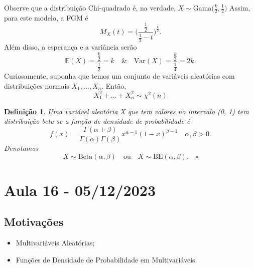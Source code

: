 \documentclass{article}
\newtheorem*{def*}{\underline{Defini\c c\~ao}}
\begin{document}
Observe que a distribuição Chi-quadrado é, na verdade, \(X\sim \mathrm{Gama}\biggl(\frac{k}{2}, \frac{1}{2}\biggr)\)
Assim, para este modelo, a FGM é 
\[
  M_{X}(t) = \biggl(\frac{\frac{1}{2}}{\frac{1}{2}-t}\biggr)^{\frac{k}{2}}.
\]
Além disso, a esperança e a variância serão 
\[
  \mathbb{E}(X) = \frac{\frac{k}{2}}{\frac{1}{2}} = k \quad\&\quad \mathrm{Var}(X) = \frac{\frac{k}{2}}{\frac{1}{4}} = 2k.
\]
Curiosamente, suponha que temos um conjunto de variáveis aleatórias com distribuições normais \(X_{1}, \dotsc , X_{n}\). Então, 
\[
  X_{1}^{2} + \dotsc + X_{n}^{2}\sim \chi^{2}(n) 
\]
\begin{def*}
  Uma variável aleatória X que tem valores no intervalo (0, 1) tem distribuição beta se a função de densidade de probabilidade é 
  \[
    f(x) = \frac{\Gamma (\alpha +\beta )}{\Gamma (\alpha )\Gamma (\beta )}x^{\alpha -1}(1-x)^{\beta -1}\quad \alpha , \beta > 0.
  \]
  Denotamos 
  \[
    X\sim \mathrm{Beta}(\alpha , \beta )\quad \text{ou}\quad X\sim \mathrm{BE}(\alpha , \beta ). \quad \square
  \]
\end{def*}
\newpage

\section{Aula 16 - 05/12/2023}
\subsection{Motivações}
\begin{itemize}
  \item Multivariáveis Aleatórias;
  \item Funções de Densidade de Probabilidade em Multivariáveis.
\end{itemize}
\end{document}
